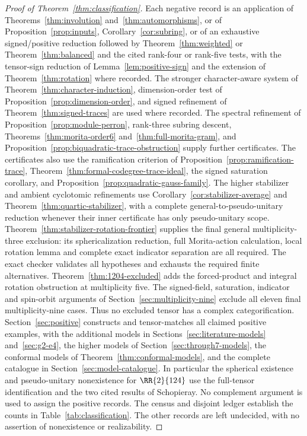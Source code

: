 \begin{proof}[Proof of Theorem~\ref{thm:classification}]
Each negative record is an application of Theorems~\ref{thm:involution}
and~\ref{thm:automorphisms}, or of Proposition~\ref{prop:inputs},
Corollary~\ref{cor:subring}, or of an exhaustive signed/positive reduction
followed by Theorem~\ref{thm:weighted} or Theorem~\ref{thm:balanced}
and the cited rank-four or rank-five tests, with the tensor-sign
reduction of Lemma~\ref{lem:positive-sign} and the extension of
Theorem~\ref{thm:rotation} where recorded. The stronger character-aware system of Theorem~\ref{thm:character-induction}, dimension-order test of Proposition~\ref{prop:dimension-order}, and signed refinement of Theorem~\ref{thm:signed-traces} are used where recorded. The spectral refinement of Proposition~\ref{prop:module-perron},
rank-three subring descent, Theorems~\ref{thm:morita-order6}
and~\ref{thm:full-morita-gram}, and
Proposition~\ref{prop:biquadratic-trace-obstruction} supply further certificates. The certificates also
use the ramification criterion of Proposition~\ref{prop:ramification-trace},
Theorem~\ref{thm:formal-codegree-trace-ideal}, the signed saturation
corollary, and Proposition~\ref{prop:quadratic-gauss-family}. The higher
stabilizer and ambient cyclotomic refinements use
Corollary~\ref{cor:stabilizer-average} and
Theorem~\ref{thm:quartic-stabilizer}, with a complete general-to-pseudo-unitary
reduction whenever their inner certificate has only pseudo-unitary scope.
Theorem~\ref{thm:stabilizer-rotation-frontier} supplies the final general
multiplicity-three exclusion: its sphericalization reduction, full
Morita-action calculation, local rotation lemma and complete exact
indicator separation are all required. The exact checker validates
all hypotheses and exhausts the required finite alternatives.
Theorem~\ref{thm:1204-excluded} adds the forced-product and integral
rotation obstruction at multiplicity five. The signed-field, saturation,
indicator and spin-orbit arguments of Section~\ref{sec:multiplicity-nine}
exclude all eleven final multiplicity-nine cases. Thus no
excluded tensor has a complex categorification. Section~\ref{sec:positive}
constructs and tensor-matches all claimed positive examples, with the
additional models in Sections~\ref{sec:literature-models} and~\ref{sec:g2-e4}, the higher models of Section~\ref{sec:through7-models}, the conformal
models of Theorem~\ref{thm:conformal-models}, and the complete
catalogue in Section~\ref{sec:model-catalogue}. In particular the spherical
existence and pseudo-unitary nonexistence for $\RR{2}{124}$ use the
full-tensor identification and the two cited results of Schopieray. No complement argument is used
to assign the positive records. The census and disjoint ledger establish the counts in
Table~\ref{tab:classification}. The other records are left undecided,
with no assertion of nonexistence or realizability.
\end{proof}

